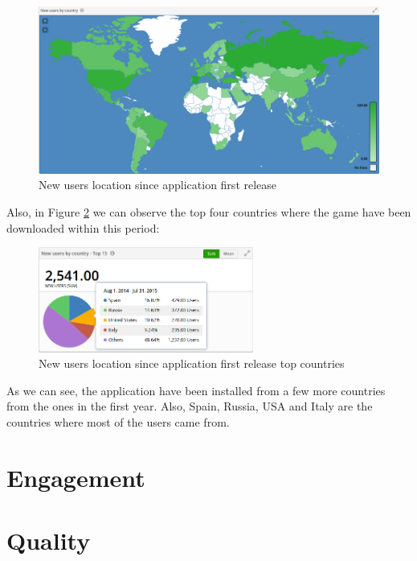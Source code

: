 \begin{figure}[h]
\centering
\includegraphics[width=350pt]{graphics/evaluation/map_users_year.png}
\caption{New users location since application first release}
\label{fig:map-all-year}
\end{figure}

Also, in Figure \ref{fig:chart-all-year} we can observe the top four countries where the game have been downloaded within this period:

\begin{figure}[h]
\centering
\includegraphics[width=200pt]{graphics/evaluation/chart_users_year.png}
\caption{New users location since application first release top countries}
\label{fig:chart-all-year}
\end{figure}

\FloatBarrier

As we can see, the application have been installed from a few more countries from the ones in the first year. Also, Spain, Russia, USA and Italy are the countries where most of the users came from.

\section{Engagement}

\section{Quality}
